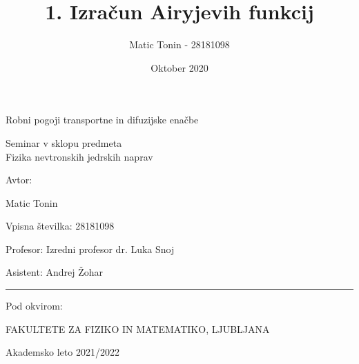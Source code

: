 \documentclass[slovene,11pt,a4paper]{article}
\title{1. Izračun Airyjevih funkcij}
\author{Matic Tonin - 28181098 }
\date{Oktober 2020}
\begin{document}
\begin{center}
\thispagestyle{empty}
\parskip=14pt%
\vspace*{3\parskip}%
\begin{Huge}Robni pogoji transportne in difuzijske enačbe\end{Huge}


Seminar v sklopu predmeta \\
Fizika nevtronskih jedrskih naprav

Avtor:

Matic Tonin

Vpisna številka: 28181098


Profesor: Izredni profesor dr. Luka Snoj 

Asistent: Andrej Žohar

\rule{7cm}{0.4pt}

Pod okvirom:

FAKULTETE ZA FIZIKO IN MATEMATIKO, LJUBLJANA

Akademsko leto 2021/2022


\end{center}
\pagebreak
\end{document}
